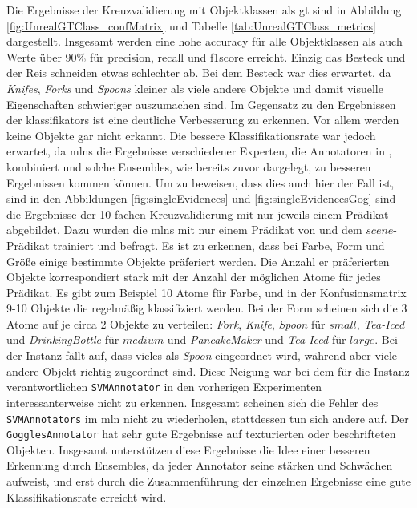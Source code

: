 Die Ergebnisse der Kreuzvalidierung mit Objektklassen als \gls{gt} sind in Abbildung \ref{fig:UnrealGTClass_confMatrix} und Tabelle \ref{tab:UnrealGTClass_metrics} dargestellt. Insgesamt werden eine hohe \gls{accuracy} für alle Objektklassen als auch Werte über 90\% für \gls{precision}, \gls{recall} und \gls{f1score} erreicht. Einzig das Besteck und der Reis schneiden etwas schlechter ab. Bei dem Besteck war dies erwartet, da \textit{Knifes}, \textit{Forks} und \textit{Spoons} kleiner  als viele andere Objekte und damit visuelle Eigenschaften schwieriger auszumachen sind. Im Gegensatz zu den Ergebnissen der \glspl{klassifikator} ist eine deutliche Verbesserung zu erkennen. Vor allem werden keine Objekte gar nicht erkannt. Die bessere Klassifikationsrate war jedoch erwartet, da \glspl{mln} die Ergebnisse verschiedener Experten, die Annotatoren in \robosherlock, kombiniert und solche Ensembles, wie bereits zuvor dargelegt, zu besseren Ergebnissen kommen können. \newline
Um zu beweisen, dass dies auch hier der Fall ist, sind in den Abbildungen \ref{fig:singleEvidences} und \ref{fig:singleEvidencesGog} sind die Ergebnisse der 10-fachen Kreuzvalidierung mit nur jeweils einem Prädikat abgebildet. Dazu wurden die \glspl{mln} mit nur einem Prädikat von \robosherlock und dem $scene$-Prädikat trainiert und befragt. \newline
Es ist zu erkennen, dass bei Farbe, Form und Größe einige bestimmte Objekte präferiert werden. Die Anzahl er präferierten Objekte korrespondiert stark mit der Anzahl der möglichen Atome für jedes Prädikat. Es gibt zum Beispiel 10 Atome für Farbe, und in der Konfusionsmatrix 9-10 Objekte die regelmäßig klassifiziert werden. Bei der Form scheinen sich die 3 Atome auf je circa 2 Objekte zu verteilen: \textit{Fork}, \textit{Knife}, \textit{Spoon} für $small$, \textit{Tea-Iced} und \textit{DrinkingBottle} für $medium$ und \textit{PancakeMaker} und \textit{Tea-Iced} für $large$. Bei der Instanz fällt auf, dass vieles als \textit{Spoon} eingeordnet wird, während aber viele andere Objekt richtig zugeordnet sind. Diese Neigung war bei dem für die Instanz verantwortlichen \texttt{SVMAnnotator} in den vorherigen Experimenten interessanterweise nicht zu erkennen. Insgesamt scheinen sich die Fehler des \texttt{SVMAnnotators} im \gls{mln} nicht zu wiederholen, stattdessen tun sich andere auf. Der \texttt{GogglesAnnotator} hat sehr gute Ergebnisse auf texturierten oder beschrifteten Objekten. Insgesamt unterstützen diese Ergebnisse die Idee einer besseren Erkennung durch Ensembles, da jeder Annotator seine stärken und Schwächen aufweist, und erst durch die Zusammenführung der einzelnen Ergebnisse eine gute Klassifikationsrate erreicht wird.\par

